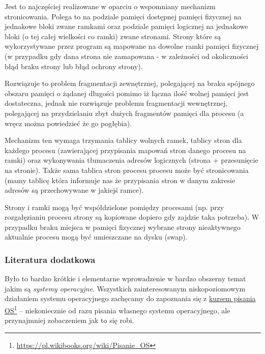 Jest to najczęściej realizowane w oparciu o wspomniany mechanizm stronicowania. Polega to na podziale pamięci dostępnej pamięci fizycznej na jednakowe bloki zwane ramkami oraz podziale pamięci logicznej na jednakowe bloki (o tej całej wielkości co ramki) zwane stronami. Strony które są wykorzystywane przez program są mapowane na dowolne ramki pamięci fizycznej (w przypadku gdy dana strona nie zamapowana - w zależności od okoliczności błąd braku strony lub błąd ochrony strony).

Rozwiązuje to problem fragmentacji zewnętrznej, polegającej na braku spójnego obszaru pamięci o żądanej długości pomimo iż łączna ilość wolnej pamięci jest dostateczna, jednak nie rozwiązuje problemu fragmentacji wewnętrznej, polegającej na przydzielaniu zbyt dużych fragmentów pamięci dla procesu (a wręcz można powiedzieć że go pogłębia).

Mechanizm ten wymaga trzymania tablicy wolnych ramek, tablicy stron dla każdego procesu (zawierającej przypisania mapowań stron danego procesu na ramki) oraz wykonywania tłumaczenia adresów logicznych (strona + przesunięcie na stronie). Także sama tablica stron procesu procesu może być stronicowania (mamy tablicę która informuje nas że przypisania stron w danym zakresie adresów są przechowywane w jakiejś ramce).

Strony i ramki mogą być współdzielone pomiędzy procesami (np. przy rozgałęzianiu procesu strony są kopiowane dopiero gdy zajdzie taka potrzeba). W przypadku braku miejsca w pamięci fizycznej wybrane strony nieaktywnego aktualnie procesu mogą być umieszczane na dysku (swap).

\subsubsection{Literatura dodatkowa {\Symbola 🤔}}

Było to bardzo krótkie i elementarne wprowadzenie w bardzo obszerny temat jakim są \textit{systemy operacyjne}. Wszystkich zainteresowanym niskopoziomowym działaniem systemu operacyjnego zachęcamy do zapoznania się z \href{https://pl.wikibooks.org/wiki/Pisanie_OS}{kursem pisania OS}\footnote{\url{https://pl.wikibooks.org/wiki/Pisanie_OS}} – niekoniecznie od razu pisania własnego systemu operacyjnego, ale przynajmniej zobaczeniem jak to się robi.
